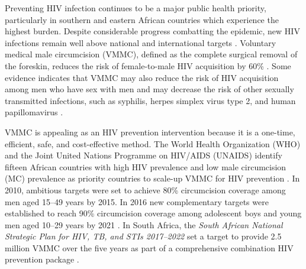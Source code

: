 \documentclass{article}
\begin{document}
Preventing HIV infection continues to be a major public health priority, particularly in southern and eastern African countries which experience the highest burden. Despite considerable progress combatting the epidemic, new HIV infections remain well above national and international targets \cite{UNAIDSHighLevel}. Voluntary medical male circumcision (VMMC), defined as the complete surgical removal of the foreskin, reduces the risk of female-to-male HIV acquisition by 60\% \cite{gray2007male, bailey2007male, auvert2005randomized, gray2012effectiveness, grund2017association}. Some evidence indicates that VMMC may also reduce the risk of HIV acquisition among men who have sex with men \cite{pintye2019benefits} and may decrease the risk of other sexually transmitted infections, such as syphilis, herpes simplex virus type 2, and human papillomavirus \cite{tobian2009male}.

VMMC is appealing as an HIV prevention intervention because it is a one-time, efficient, safe, and cost-effective method. The World Health Organization (WHO) and the Joint United Nations Programme on HIV/AIDS (UNAIDS) identify fifteen African countries with high HIV prevalence and low male circumcision (MC) prevalence as priority countries to scale-up VMMC for HIV prevention \cite{UNAIDSJoint, davis2018progress, WHOVoluntary2}. In 2010, ambitious targets were set to achieve 80\% circumcision coverage among men aged 15--49 years by 2015. In 2016 new complementary targets were established to reach 90\% circumcision coverage among adolescent boys and young men aged 10--29 years by 2021  \cite{WHOFramework}. In South Africa, the \textit{South African National Strategic Plan for HIV, TB, and STIs 2017--2022} set a target to provide 2.5 million VMMC over the five years as part of a comprehensive combination HIV prevention package \cite{sanac}.
\end{document}
